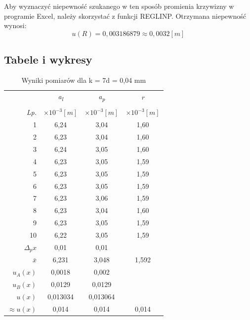 \documentclass[polish, 11pt, a4paper]{article}
\begin{document}
		Aby wyznaczyć niepewność szukanego w ten sposób promienia krzywizny w programie Excel, należy skorzystać z funkcji REGLINP. Otrzymana niepewność wynosi:
		\begin{displaymath}
		u(R)=0,003186879\approx 0,0032[m]
		\end{displaymath}
		
	\newpage
	\subsection{Tabele i wykresy}
		\begin{table}[H]
		\begin{minipage}{.5\textwidth}
			\centering
			\captionsetup{singlelinecheck=false, margin = .5cm, justification=centering}
			\caption{Wyniki pomiarów dla k = 7\newline 	d = 0,04 mm}
			\begin{tabular}{|r|c|c|c|} \hline
					&	\textit{a\textsubscript{l}}	&	\textit{a\textsubscript{p}}	&	\textit{r}	\\
				&&& \\[-1em]
				\textit{Lp.}& \(\times{10^{-3} [m]}\)& \(\times{10^{-3} [m]}\)& \(\times{10^{-3} [m]}\) \\\hline	
				1	&	6,24	&	3,04	&	1,60	\\\hline
				2	&	6,23	&	3,04	&	1,60	\\\hline
				3	&	6,24	&	3,05	&	1,60	\\\hline
				4	&	6,23	&	3,05	&	1,59	\\\hline
				5	&	6,23	&	3,05	&	1,59	\\\hline
				6	&	6,23	&	3,05	&	1,59	\\\hline
				7	&	6,23	&	3,06	&	1,59	\\\hline
				8	&	6,23	&	3,04	&	1,60	\\\hline
				9	&	6,23	&	3,05	&	1,59	\\\hline
				10	&	6,22	&	3,05	&	1,59	\\\hline
				\(\Delta{_px}\)	&	0,01	&	0,01	&		\\\hline
				\(\bar{x}\)	&	6,231	&	3,048	&	1,592	\\\hline
				\(u_A(x)\)	&	0,0018	&	0,002	&		\\\hline
				\(u_B(x)\)	&	0,0129	&	0,0129	&		\\\hline
				\(u(x)\)	&	0,013034	&	0,013064	&		\\\hline
				\(\approx{u(x)}\)	&	0,014	&	0,014	&	0,014	\\\hline
			\end{tabular}
			\vspace{0.75cm}
			

\end{minipage}
\end{table}
\end{document}
